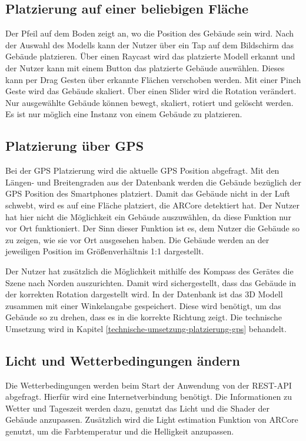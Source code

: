 \subsection{Platzierung auf einer beliebigen Fläche}
Der Pfeil auf dem Boden zeigt an, wo die Position des Gebäude sein wird. Nach der Auswahl des Modells kann der Nutzer über ein Tap auf dem Bildschirm das Gebäude platzieren. Über einen Raycast wird das platzierte Modell erkannt und der Nutzer kann mit einem Button das platzierte Gebäude auswählen. Dieses kann per Drag Gesten über erkannte Flächen verschoben werden. Mit einer Pinch Geste wird das Gebäude skaliert. Über einen Slider wird die Rotation verändert. Nur ausgewählte Gebäude können bewegt, skaliert, rotiert und gelöscht werden. Es ist nur möglich eine Instanz von einem Gebäude zu platzieren.

\subsection{Platzierung über GPS}
Bei der GPS Platzierung wird die aktuelle GPS Position abgefragt. Mit den Längen- und Breitengraden aus der Datenbank werden die Gebäude bezüglich der GPS Position des Smartphones platziert. Damit das Gebäude nicht in der Luft schwebt, wird es auf eine Fläche platziert, die ARCore detektiert hat. Der Nutzer hat hier nicht die Möglichkeit ein Gebäude auszuwählen, da diese Funktion nur vor Ort funktioniert. Der Sinn dieser Funktion ist es, dem Nutzer die Gebäude so zu zeigen, wie sie vor Ort ausgesehen haben. Die Gebäude werden an der jeweiligen Position im Größenverhältnis 1:1 dargestellt.

Der Nutzer hat zusätzlich die Möglichkeit mithilfe des Kompass des Gerätes die Szene nach Norden auszurichten. Damit wird sichergestellt, dass das Gebäude in der korrekten Rotation dargestellt wird. In der Datenbank ist das 3D Modell zusammen mit einer Winkelangabe gespeichert. Diese wird benötigt, um das Gebäude so zu drehen, dass es in die korrekte Richtung zeigt. Die technische Umsetzung wird in Kapitel \ref*{technische-umsetzung-platzierung-gps} behandelt.

\subsection{Licht und Wetterbedingungen ändern}
Die Wetterbedingungen werden beim Start der Anwendung von der REST-API abgefragt. Hierfür wird eine Internetverbindung benötigt. Die Informationen zu Wetter und Tageszeit werden dazu, genutzt das Licht und die Shader der Gebäude anzupassen. Zusätzlich wird die Light estimation Funktion von ARCore genutzt, um die Farbtemperatur und die Helligkeit anzupassen.